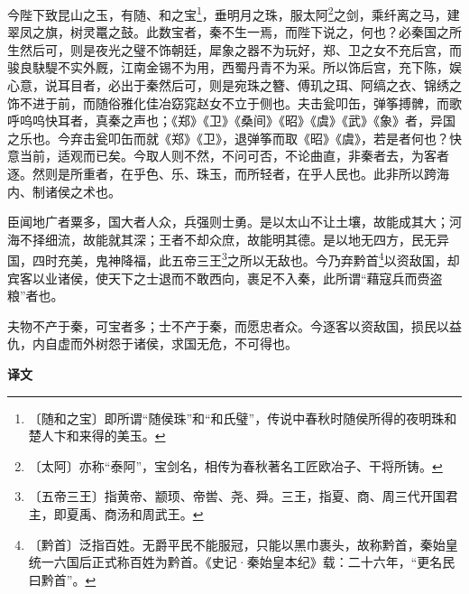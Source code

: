 \documentclass[12pt,UTF-8,openany,a4]{ctexbook}
\begin{document}
\begin{large}
    今陛下致昆山之玉，有随、和之宝\footnote{〔随和之宝〕\yiwen 即所谓“随侯珠”和“和氏璧”，传说中春秋时随侯所得的夜明珠和楚人卞和来得的美玉。}，垂明月之珠，服太阿\footnote{〔太阿〕\yiwen 亦称“泰阿”，宝剑名，相传为春秋著名工匠欧冶子、干将所铸。}之剑，乘纤离之马，建翠凤之旗，树灵鼍之鼓。此数宝者，秦不生一焉，而陛下说之，何也？必秦国之所生然后可，则是夜光之璧不饰朝廷，犀象之器不为玩好，郑、卫之女不充后宫，而骏良駃騠不实外厩，江南金锡不为用，西蜀丹青不为采。所以饰后宫，充下陈，娱心意，说耳目者，必出于秦然后可，则是宛珠之簪、傅玑之珥、阿缟之衣、锦绣之饰不进于前，而随俗雅化佳冶窈窕赵女不立于侧也。夫击瓮叩缶，弹筝搏髀，而歌呼呜呜快耳者，真秦之声也；《郑》《卫》《桑间》《昭》《虞》《武》《象》者，异国之乐也。今弃击瓮叩缶而就《郑》《卫》，退弹筝而取《昭》《虞》，若是者何也？快意当前，适观而已矣。今取人则不然，不问可否，不论曲直，非秦者去，为客者逐。然则是所重者，在乎色、乐、珠玉，而所轻者，在乎人民也。此非所以跨海内、制诸侯之术也。
    
    臣闻地广者粟多，国大者人众，兵强则士勇。是以太山不让土壤，故能成其大；河海不择细流，故能就其深；王者不却众庶，故能明其德。是以地无四方，民无异国，四时充美，鬼神降福，此五帝三王\footnote{〔五帝三王〕\yiwen 指黄帝、颛顼、帝喾、尧、舜。三王，指夏、商、周三代开国君主，即夏禹、商汤和周武王。}之所以无敌也。今乃弃黔首\footnote{〔黔首〕\yiwen 泛指百姓。无爵平民不能服冠，只能以黑巾裹头，故称黔首，秦始皇统一六国后正式称百姓为黔首。《史记·秦始皇本纪》载：二十六年，“更名民曰黔首”。}以资敌国，却宾客以业诸侯，使天下之士退而不敢西向，裹足不入秦，此所谓“藉寇兵而赍盗粮”者也。
    
    夫物不产于秦，可宝者多；士不产于秦，而愿忠者众。今逐客以资敌国，损民以益仇，内自虚而外树怨于诸侯，求国无危，不可得也。
\end{large}


\newpage

\begin{Large}
    \noindent\textbf{译文}
\end{Large}


\vspace{1em}
\end{document}
